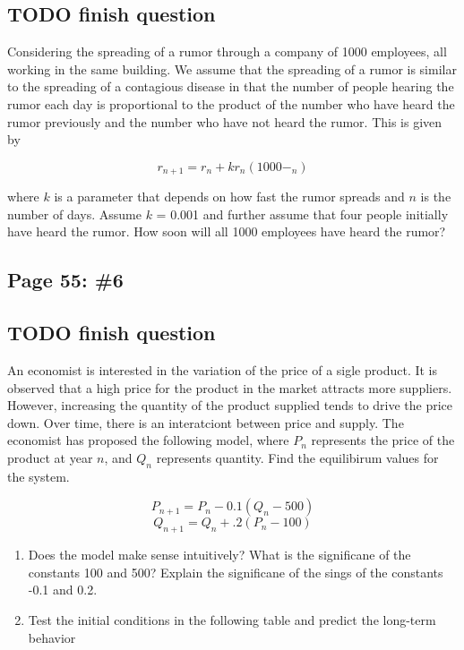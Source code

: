 \documentclass[]{article}
\begin{document}
\subsection{TODO finish question}\label{todo-finish-question}

Considering the spreading of a rumor through a company of 1000
employees, all working in the same building. We assume that the
spreading of a rumor is similar to the spreading of a contagious disease
in that the number of people hearing the rumor each day is proportional
to the product of the number who have heard the rumor previously and the
number who have not heard the rumor. This is given by

\[r_{n+1} = r_n + kr_n(1000- _n)\]

where \(k\) is a parameter that depends on how fast the rumor spreads
and \(n\) is the number of days. Assume \(k\) = 0.001 and further assume
that four people initially have heard the rumor. How soon will all 1000
employees have heard the rumor?

\subsection{Page 55: \#6}\label{page-55-6}

\subsection{TODO finish question}\label{todo-finish-question-1}

An economist is interested in the variation of the price of a sigle
product. It is observed that a high price for the product in the market
attracts more suppliers. However, increasing the quantity of the product
supplied tends to drive the price down. Over time, there is an
interatciont between price and supply. The economist has proposed the
following model, where \(P_n\) represents the price of the product at
year \(n\), and \(Q_n\) represents quantity. Find the equilibirum values
for the system.

\[P_{n+1} = P_n - 0.1(Q_n -500)\] \[Q_{n+1} = Q_n + .2(P_n - 100)\]

\begin{enumerate}
\def\labelenumi{\alph{enumi}.}
\item
  Does the model make sense intuitively? What is the significane of the
  constants 100 and 500? Explain the significane of the sings of the
  constants -0.1 and 0.2.
\item
  Test the initial conditions in the following table and predict the
  long-term behavior
\end{enumerate}
\end{document}
